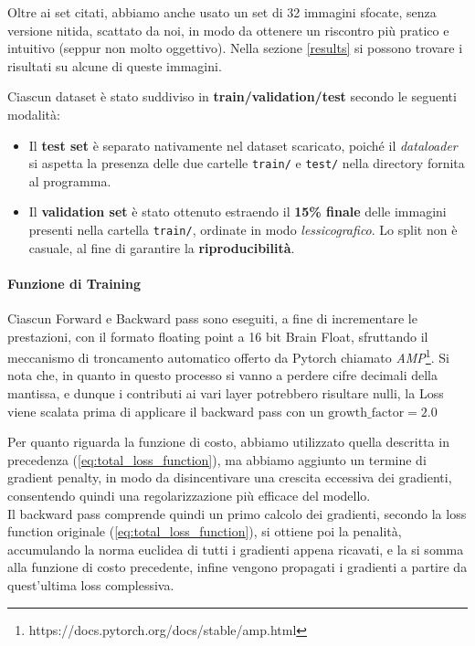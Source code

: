 \documentclass[a4paper,10pt,twocolumn]{article}
\begin{document}
Oltre ai set citati, abbiamo anche usato un set di 32 immagini sfocate, senza versione nitida, scattato da noi, in modo da ottenere un riscontro più pratico e intuitivo (seppur non molto oggettivo). Nella sezione \ref{results} si possono trovare i risultati su alcune di queste immagini.

Ciascun dataset è stato suddiviso in \textbf{train/validation/test} secondo le seguenti modalità:
\begin{itemize}
    \item Il \textbf{test set} è separato nativamente nel dataset scaricato, poiché il \textit{dataloader} si aspetta la presenza delle due cartelle \texttt{train/} e \texttt{test/} nella directory fornita al programma.
    \item Il \textbf{validation set} è stato ottenuto estraendo il \textbf{15\% finale} delle immagini presenti nella cartella \texttt{train/}, ordinate in modo \textit{lessicografico}. Lo split non è casuale, al fine di garantire la \textbf{riproducibilità}.
\end{itemize}

\paragraph{Funzione di Training}
Ciascun Forward e Backward pass sono eseguiti, a fine di incrementare le prestazioni, con il formato floating point a 16 bit Brain Float,
sfruttando il meccanismo di troncamento automatico offerto da Pytorch chiamato \textit{AMP}\footnote{https://docs.pytorch.org/docs/stable/amp.html}.
Si nota che, in quanto in questo processo si vanno a perdere cifre decimali della mantissa, e dunque i contributi ai vari layer potrebbero risultare nulli,
la Loss viene scalata prima di applicare il backward pass con un $\mathrm{growth\_factor} = 2.0$

Per quanto riguarda la funzione di costo, abbiamo utilizzato quella descritta in precedenza (\ref{eq:total_loss_function}),
ma abbiamo aggiunto un termine di gradient penalty, in modo da disincentivare una crescita eccessiva dei gradienti, consentendo quindi una regolarizzazione più efficace del modello. \\
Il backward pass comprende quindi un primo calcolo dei gradienti, secondo la loss function originale (\ref{eq:total_loss_function}), si ottiene poi la penalità,
accumulando la norma euclidea di tutti i gradienti appena ricavati, e la si somma alla funzione di costo precedente, infine vengono propagati i gradienti a partire da quest'ultima loss complessiva.
\end{document}
